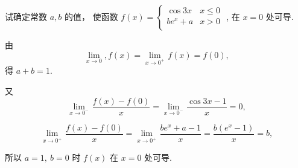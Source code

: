 \begin{problem}试确定常数 $a,b$ 的值， 使函数
$f\left( x \right) =  \begin{cases}
\cos{3x} & x \leq 0 \\
be^{x} + a & x > 0 \\
\end{cases} $ , 在 $x = 0$
处可导.

\begin{solution}
由	
$$\lim_{x \rightarrow 0}{,f}\left( x \right) = \lim_{x \rightarrow 0^{+}}\mspace{2mu} f\left( x \right) = f(0),$$
得 $a + b = 1$.

又
$$\lim_{x \rightarrow 0^{-}}\mspace{2mu}\frac{f(x) - f(0)}{x} = \lim_{x \rightarrow 0^{-}}\mspace{2mu}\frac{\cos 3x - 1}{x} = 0,$$

$$\lim_{x \rightarrow 0^{+}}\mspace{2mu}\frac{f(x) - f(0)}{x} = \lim_{x \rightarrow 0^{+}}\mspace{2mu}\frac{be^{x} + a - 1}{x} = \frac{b\left( e^{x} - 1 \right)}{x} = b,$$

所以 $a = 1,\ b = 0$ 时 $f\left( x \right)$ 在 $x = 0$ 处可导.
\end{solution}


\end{problem}           

